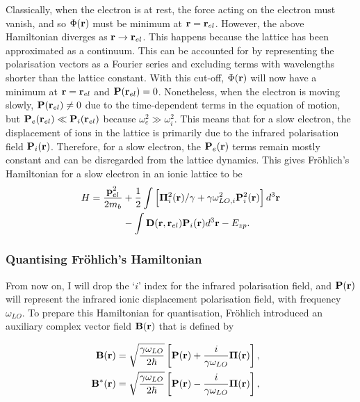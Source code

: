 Classically, when the electron is at rest, the force acting on the electron must vanish, and so $\Phi(\vb{r})$ must be minimum at $\vb{r} = \vb{r}_{el}$. However, the above Hamiltonian diverges as $\vb{r} \to \vb{r}_{el}$. This happens because the lattice has been approximated as a continuum. This can be accounted for by representing the polarisation vectors as a Fourier series and excluding terms with wavelengths shorter than the lattice constant. With this cut-off, $\Phi(\vb{r})$ will now have a minimum at $\vb{r} = \vb{r}_{el}$ and $\vb{P}(\vb{r}_{el}) = 0$. Nonetheless, when the electron is moving slowly, $\vb{P}(\vb{r}_{el}) \neq 0$ due to the time-dependent terms in the equation of motion, but $\vb{P}_e(\vb{r}_{el}) \ll \vb{P}_i(\vb{r}_{el})$ because $\omega^2_e \gg \omega^2_i$. This means that for a slow electron, the displacement of ions in the lattice is primarily due to the infrared polarisation field $\vb{P}_i(\vb{r})$. Therefore, for a slow electron, the $\vb{P}_e(\vb{r})$ terms remain mostly constant and can be disregarded from the lattice dynamics. This gives Fr\"ohlich's  Hamiltonian for a slow electron in an ionic lattice to be
\begin{equation}
\begin{aligned}
    H = \frac{\vb{p}_{el}^2}{2 m_b} &+ \frac{1}{2} \int \left[\vb{\Pi}_{i}^2(\vb{r})/\gamma + \gamma\omega_{LO, i}^2 \vb{P}^2_i (\vb{r}) \right] d^3 \vb{r} \\
    &- \int \vb{D}(\vb{r},\vb{r}_{el})\vb{P}_i(\vb{r}) d^3\vb{r} - E_{zp} .
\end{aligned}
\label{eqn-2121-16:frohlich_hamiltonian_slow}
\end{equation}

\subsubsection{Quantising Fr\"ohlich's Hamiltonian}
\label{subsubsec:2-1-2-2}

From now on, I will drop the `$i$' index for the infrared polarisation field, and $\vb{P}(\vb{r})$ will represent the infrared ionic displacement polarisation field, with frequency $\omega_{LO}$. To prepare this Hamiltonian for quantisation, Fr\"ohlich introduced an auxiliary complex vector field $\vb{B}(\vb{r})$ that is defined by

\begin{subequations}
\begin{align}
    \begin{split}
    \vb{B}(\vb{r}) &= \sqrt{\frac{\gamma \omega_{LO}}{2\hbar}} \left[ \vb{P}(\vb{r}) + \frac{i}{\gamma\omega_{LO}} \vb{\Pi}(\vb{r})\right],
    \end{split}\\
    \begin{split}
    \vb{B}^*(\vb{r}) &= \sqrt{\frac{\gamma \omega_{LO}}{2\hbar}} \left[ \vb{P}(\vb{r}) - \frac{i}{\gamma\omega_{LO}} \vb{\Pi}(\vb{r})\right],
    \end{split}
\end{align}
\end{subequations}

